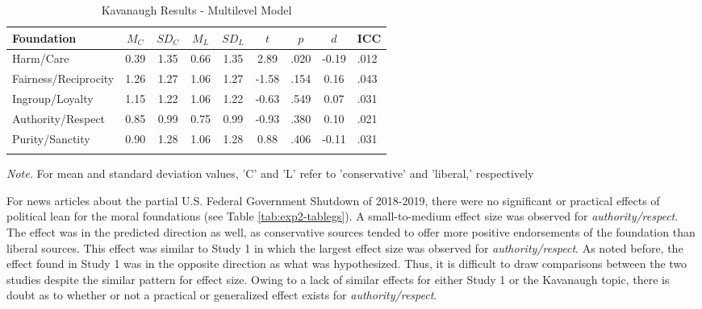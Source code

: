 \documentclass[
  man,floatsintext]{apa6}
\begin{document}
\begin{table}[h]

\begin{center}
\begin{threeparttable}

\caption{\label{tab:exp2-tablekav}Kavanaugh Results - Multilevel Model}

\footnotesize{

\begin{tabular}{lcccccccl}
\toprule
Foundation & $M_C$ & $SD_C$ & $M_L$ & $SD_L$ & $t$ & $p$ & $d$ & ICC\\
\midrule
Harm/Care & 0.39 & 1.35 & 0.66 & 1.35 & 2.89 & .020 & -0.19 & .012\\
Fairness/Reciprocity & 1.26 & 1.27 & 1.06 & 1.27 & -1.58 & .154 & 0.16 & .043\\
Ingroup/Loyalty & 1.15 & 1.22 & 1.06 & 1.22 & -0.63 & .549 & 0.07 & .031\\
Authority/Respect & 0.85 & 0.99 & 0.75 & 0.99 & -0.93 & .380 & 0.10 & .021\\
Purity/Sanctity & 0.90 & 1.28 & 1.06 & 1.28 & 0.88 & .406 & -0.11 & .031\\
\bottomrule
\addlinespace
\end{tabular}

}

\begin{tablenotes}[para]
\normalsize{\textit{Note.} For mean and standard deviation values, 'C' and 'L' refer to 'conservative' and 'liberal,' respectively}
\end{tablenotes}

\end{threeparttable}
\end{center}

\end{table}

For news articles about the partial U.S. Federal Government Shutdown of 2018-2019, there were no significant or practical effects of political lean for the moral foundations (see Table \ref{tab:exp2-tablegs}). A small-to-medium effect size was observed for \emph{authority/respect}. The effect was in the predicted direction as well, as conservative sources tended to offer more positive endorsements of the foundation than liberal sources. This effect was similar to Study 1 in which the largest effect size was observed for \emph{authority/respect}. As noted before, the effect found in Study 1 was in the opposite direction as what was hypothesized. Thus, it is difficult to draw comparisons between the two studies despite the similar pattern for effect size. Owing to a lack of similar effects for either Study 1 or the Kavanaugh topic, there is doubt as to whether or not a practical or generalized effect exists for \emph{authority/respect}.
\end{document}
